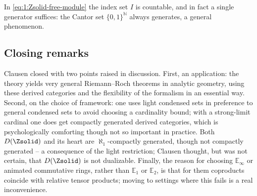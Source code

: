 \begin{remark}
\label{rmk:1:single-generator}
In \eqref{eq:1:Zsolid-free-module} the index set $I$ is countable, and in fact a
single generator suffices: the Cantor set $\{0,1\}^{\mathbb{N}}$ always generates,
a general phenomenon.
\end{remark}

\subsection{Closing remarks}

Clausen closed with two points raised in discussion. First, an application: the
theory yields very general Riemann--Roch theorems in analytic geometry, using
these derived categories and the flexibility of the formalism in an essential
way. Second, on the choice of framework: one uses light
condensed sets in preference to general condensed sets to avoid choosing a
cardinality bound; with a strong-limit cardinal one does get compactly generated
derived categories, which is psychologically comforting though not so important in
practice. Both $D(\Zsolid)$ and its heart are $\aleph_1$-compactly generated, though not
compactly generated -- a consequence of the light restriction; Clausen thought,
but was not certain, that $D(\Zsolid)$ is not dualizable. Finally, the reason for choosing $\mathbb{E}_\infty$ or animated
commutative rings, rather than $\mathbb{E}_1$ or $\mathbb{E}_2$, is that for them
coproducts coincide with relative tensor products; moving to settings where this
fails is a real inconvenience.
